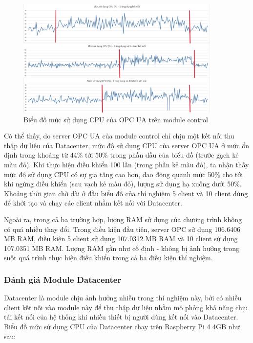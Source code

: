 \begin{figure}[H]
    \centering
    \includegraphics[width=0.9\textwidth]{Images/Result/server_cpu_2.jpg}
    \caption{Biểu đồ mức sử dụng CPU của OPC UA trên module control}
    \label{fig:server_cpu_1}
\end{figure}

Có thể thấy, do server OPC UA của module control chỉ chịu một kết nối thu thập dữ liệu của Datacenter, mức độ sử dụng CPU của server OPC UA ở mức ổn định trong khoảng từ 44\% tới 50\% trong phần đầu của biểu đồ (trước gạch kẻ màu đỏ). Khi thực hiện điều khiển 100 lần (trong phần kẻ màu đỏ), ta nhận thấy mức độ sử dụng CPU có sự gia tăng cao hơn, dao động quanh mức 50\% cho tới khi ngừng điều khiển (sau vạch kẻ màu đỏ), lượng sử dụng hạ xuống dưới 50\%. Khoảng thời gian chờ dài ở đầu biểu đồ của thí nghiệm 5 client và 10 client dùng để khởi tạo và chạy các client nhằm kết nối với Datacenter. 

Ngoài ra, trong cả ba trường hợp, lượng RAM sử dụng của chương trình không có quá nhiều thay đổi. Trong điều kiện đầu tiên, server OPC sử dụng 106.6406 MB RAM, điều kiện 5 client sử dụng 107.0312 MB RAM và 10 client sử dụng 107.0351 MB RAM. Lượng RAM gần như cố định - không bị ảnh hưởng trong suốt quá trình thực hiện điều khiển trong cả ba điều kiện thí nghiệm.

\subsubsection{Đánh giá Module Datacenter}

Datacenter là module chịu ảnh hưởng nhiều trong thí nghiệm này, bởi có nhiều client kết nối vào module này để thu thập dữ liệu nhằm mô phỏng khả năng chịu tải kết nối của hệ thống khi nhiều thiết bị người dùng kết nối vào Datacenter. Biểu đồ mức sử dụng CPU của Datacenter chạy trên Raspberry Pi 4 4GB như sau:

